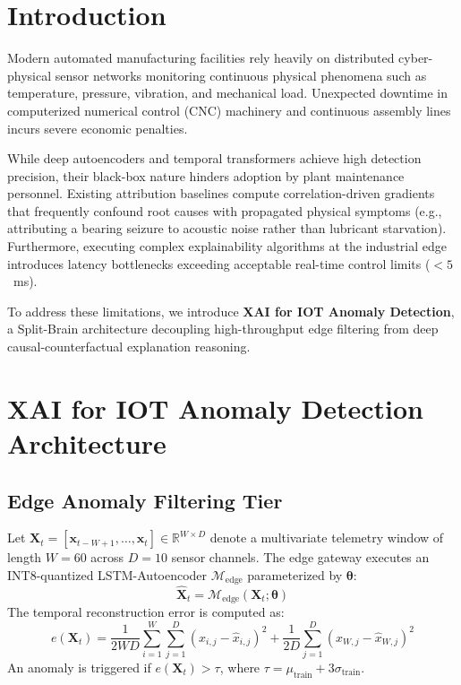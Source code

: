 \documentclass[conference]{IEEEtran}
\begin{document}
\section{Introduction}
Modern automated manufacturing facilities rely heavily on distributed cyber-physical sensor networks monitoring continuous physical phenomena such as temperature, pressure, vibration, and mechanical load. Unexpected downtime in computerized numerical control (CNC) machinery and continuous assembly lines incurs severe economic penalties.

While deep autoencoders and temporal transformers achieve high detection precision, their black-box nature hinders adoption by plant maintenance personnel. Existing attribution baselines compute correlation-driven gradients that frequently confound root causes with propagated physical symptoms (e.g., attributing a bearing seizure to acoustic noise rather than lubricant starvation). Furthermore, executing complex explainability algorithms at the industrial edge introduces latency bottlenecks exceeding acceptable real-time control limits ($< 5$~ms).

To address these limitations, we introduce \textbf{XAI for IOT Anomaly Detection}, a Split-Brain architecture decoupling high-throughput edge filtering from deep causal-counterfactual explanation reasoning.

\section{XAI for IOT Anomaly Detection Architecture}
\subsection{Edge Anomaly Filtering Tier}
Let $\mathbf{X}_t = [\mathbf{x}_{t-W+1}, \dots, \mathbf{x}_t] \in \mathbb{R}^{W \times D}$ denote a multivariate telemetry window of length $W=60$ across $D=10$ sensor channels. The edge gateway executes an INT8-quantized LSTM-Autoencoder $\mathcal{M}_{\text{edge}}$ parameterized by $\mathbf{\theta}$:
\begin{equation}
\mathbf{\hat{X}}_t = \mathcal{M}_{\text{edge}}(\mathbf{X}_t; \mathbf{\theta})
\end{equation}
The temporal reconstruction error is computed as:
\begin{equation}
e(\mathbf{X}_t) = \frac{1}{2 W D} \sum_{i=1}^W \sum_{j=1}^D (x_{i,j} - \hat{x}_{i,j})^2 + \frac{1}{2 D} \sum_{j=1}^D (x_{W,j} - \hat{x}_{W,j})^2
\end{equation}
An anomaly is triggered if $e(\mathbf{X}_t) > \tau$, where $\tau = \mu_{\text{train}} + 3\sigma_{\text{train}}$.
\end{document}
